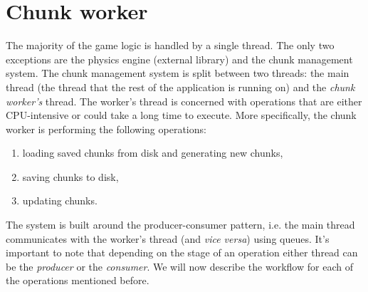 \section{Chunk worker} \label{sec:chunk-worker}
The majority of the game logic is handled by a single thread.
The only two exceptions are the physics engine (external library) and the chunk management system.
The chunk management system is split between two threads: the main thread (the thread that the rest of the application is running on) and the \textit{chunk worker's} thread.
The worker's thread is concerned with operations that are either CPU-intensive or could take a long time to execute.
More specifically, the chunk worker is performing the following operations:
\begin{enumerate}
    \item loading saved chunks from disk and generating new chunks,
    \item saving chunks to disk,
    \item updating chunks.
\end{enumerate}
The system is built around the producer-consumer pattern, i.e. the main thread communicates with the worker's thread (and \textit{vice versa}) using queues.
It's important to note that depending on the stage of an operation either thread can be the \textit{producer} or the \textit{consumer}.
We will now describe the workflow for each of the operations mentioned before.



